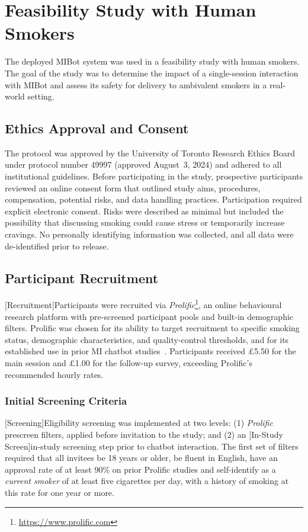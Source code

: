 \section{Feasibility Study with Human Smokers}
\label{sec:feasibility}
The deployed MIBot system was used in a feasibility study with human smokers. The goal of the study was to determine the impact of a single-session interaction with MIBot and assess its safety for delivery to ambivalent smokers in a real-world setting.

\subsection{Ethics Approval and Consent}
The protocol was approved by the University of Toronto Research Ethics Board under protocol number 49997 (approved August~3, 2024) and adhered to all institutional guidelines. Before participating in the study, prospective participants reviewed an online consent form that outlined study aims, procedures, compensation, potential risks, and data handling practices. Participation required explicit electronic consent. Risks were described as minimal but included the possibility that discussing smoking could cause stress or temporarily increase cravings. No personally identifying information was collected, and all data were de-identified prior to release.

\subsection{Participant Recruitment}
\label{sec:recruitment}
[Recruitment]Participants were recruited via \textit{Prolific}\footnote{\url{https://www.prolific.com}}, an online behavioural research platform with pre-screened participant pools and built-in demographic filters. Prolific was chosen for its ability to target recruitment to specific smoking status, demographic characteristics, and quality-control thresholds, and for its established use in prior MI chatbot studies~\citep{brown2023motivational,almusharraf2020engaging}. Participants received \pounds5.50 for the main session and \pounds1.00 for the follow-up survey, exceeding Prolific's recommended hourly rates.


\subsubsection{Initial Screening Criteria}
[Screening]Eligibility screening was implemented at two levels: (1) \textit{Prolific} prescreen filters, applied before invitation to the study; and (2) an [In-Study Screen]in-study screening step prior to chatbot interaction. The first set of filters required that all invitees be 18 years or older, be fluent in English, have an approval rate of at least 90\% on prior Prolific studies and self-identify as a \emph{current smoker} of at least five cigarettes per day, with a history of smoking at this rate for one year or more.


